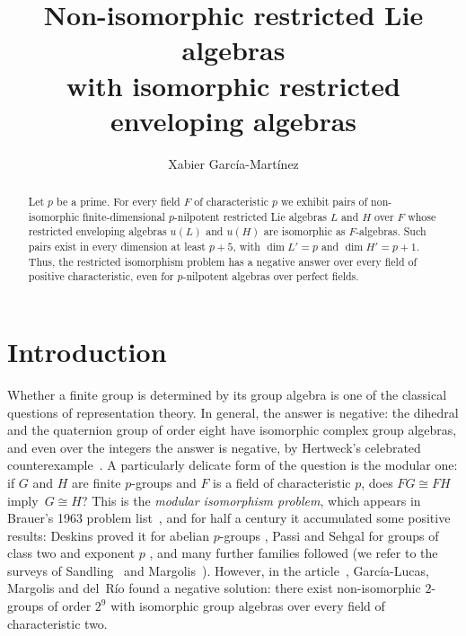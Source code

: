 \documentclass[11pt,reqno]{amsart}
\title[Restricted Lie algebras with isomorphic enveloping algebras]
{Non-isomorphic restricted Lie algebras\texorpdfstring{\\}{ }with isomorphic
restricted enveloping algebras}
\author[X. García-Martínez]{Xabier Garc\'ia-Mart\'inez}
\theoremstyle{plain}
\theoremstyle{remark}
\begin{document}
\begin{abstract}
Let $p$ be a prime. For every field $F$ of characteristic $p$ we exhibit pairs
of non-isomorphic finite-dimensional $p$-nilpotent restricted Lie algebras $L$
and $H$ over $F$ whose restricted enveloping algebras $u(L)$ and $u(H)$ are
isomorphic as $F$-algebras. Such pairs exist in every dimension at least
$p+5$, with $\dim L'=p$ and $\dim H'=p+1$. Thus, the restricted isomorphism problem has a negative answer over every
field of positive characteristic, even for $p$-nilpotent algebras over
perfect fields. 
\end{abstract}

\maketitle

\section{Introduction}\label{sec:intro}

Whether a finite group is determined by its group algebra is one of the
classical questions of representation theory. In general, the answer
is negative: the dihedral and the quaternion group of order eight have
isomorphic complex group algebras, and even over the integers the answer is
negative, by Hertweck's celebrated counterexample~\cite{Hertweck}. A particularly delicate form of the question is the modular one: 
if $G$ and $H$ are finite
$p$-groups and $F$ is a field of characteristic $p$, does $FG\cong FH$ imply~$G\cong H$? This is the \emph{modular isomorphism problem}, which appears in Brauer's 1963 problem list~\cite{Brauer}, and for half a century it
accumulated some positive results: Deskins proved it for abelian $p$-groups
\cite{Deskins}, Passi and Sehgal for groups of class two and exponent $p$
\cite{PassiSehgal}, and many further families followed (we refer to the
surveys of Sandling~\cite{Sandling} and Margolis~\cite{Margolis}). However, in the
article~\cite{GLMdR}, Garc\'ia-Lucas, Margolis and del~R\'io found a negative solution:
there exist non-isomorphic $2$-groups of order
$2^9$ with isomorphic group algebras over every field of characteristic two.
\end{document}
